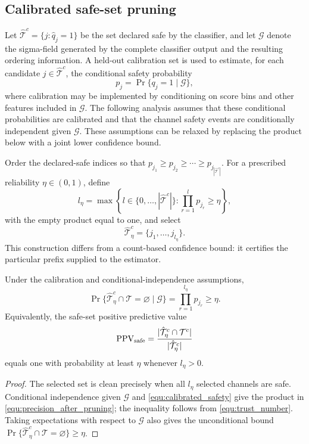 \subsection{Calibrated safe-set pruning}
Let $\hat{\mathcal{T}}^c=\{j:\hat q_j=1\}$ be the set declared safe by the classifier, and let $\mathcal{G}$ denote the sigma-field generated by the complete classifier output and the resulting ordering information. A held-out calibration set is used to estimate, for each candidate $j\in\hat{\mathcal{T}}^c$, the conditional safety probability
\begin{equation}\label{equ:calibrated_safety}
p_j=\Pr\{q_j=1\mid\mathcal{G}\},
\end{equation}
where calibration may be implemented by conditioning on score bins and other features included in $\mathcal G$. The following analysis assumes that these conditional probabilities are calibrated and that the channel safety events are conditionally independent given $\mathcal G$. These assumptions can be relaxed by replacing the product below with a joint lower confidence bound.

Order the declared-safe indices so that
$p_{j_1}\ge p_{j_2}\ge\cdots\ge p_{j_{|\hat{\mathcal{T}}^c|}}$.
For a prescribed reliability $\eta\in(0,1)$, define
\begin{equation}\label{equ:trust_number}
l_\eta=
\max\left\{
l\in\{0,\ldots,|\hat{\mathcal{T}}^c|\}:
\prod_{r=1}^{l}p_{j_r}\ge\eta
\right\},
\end{equation}
with the empty product equal to one, and select
\begin{equation}\label{equ:pruning_alg}
\hat{\mathcal{T}}_\eta^c=\{j_1,\ldots,j_{l_\eta}\}.
\end{equation}
This construction differs from a count-based confidence bound: it certifies the particular prefix supplied to the estimator.

\begin{proposition}\label{Prop:safe_precision}
Under the calibration and conditional-independence assumptions,
\begin{equation}\label{equ:precision_after_pruning}
\Pr\{\hat{\mathcal{T}}_\eta^c\cap\mathcal{T}=\varnothing\mid\mathcal G\}
=\prod_{r=1}^{l_\eta}p_{j_r}\ge\eta.
\end{equation}
Equivalently, the safe-set positive predictive value
\begin{equation}\label{equ:PPV_def}
\operatorname{PPV}_{\rm safe}
=\frac{|\hat{\mathcal{T}}_\eta^c\cap\mathcal{T}^c|}
{|\hat{\mathcal{T}}_\eta^c|}
\end{equation}
equals one with probability at least $\eta$ whenever $l_\eta>0$.
\end{proposition}
\begin{proof}
The selected set is clean precisely when all $l_\eta$ selected channels are safe. Conditional independence given $\mathcal G$ and \eqref{equ:calibrated_safety} give the product in \eqref{equ:precision_after_pruning}; the inequality follows from \eqref{equ:trust_number}. Taking expectations with respect to $\mathcal G$ also gives the unconditional bound $\Pr\{\hat{\mathcal{T}}_\eta^c\cap\mathcal{T}=\varnothing\}\ge\eta$.
\end{proof}

